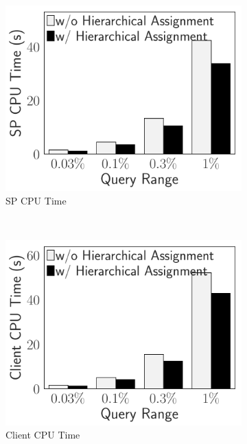 \begin{figure}[t]
    \centering
    \begin{subfigure}{.33\linewidth}
        \includegraphics[width=\linewidth]{exp-figs/access-control/hierarchical_sp.pdf}
        \caption{SP CPU Time}
    \end{subfigure}~%
    \begin{subfigure}{.33\linewidth}
        \includegraphics[width=\linewidth]{exp-figs/access-control/hierarchical_user.pdf}
        \caption{Client CPU Time}
    \end{subfigure}~%
    \begin{subfigure}{.33\linewidth}

\end{subfigure}
\end{figure}
